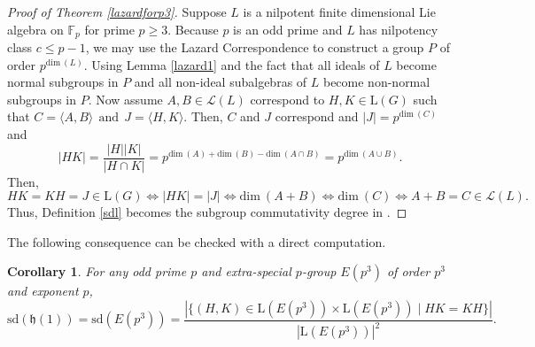 \documentclass{amsart}
\newtheorem{corollary}[theorem]{Corollary}
\theoremstyle{definition}
\numberwithin{equation}{section}
\begin{document}
\begin{proof}[Proof of Theorem \ref{lazardforp3}]
Suppose $L$ is a nilpotent finite dimensional Lie algebra on \(\mathbb{F}_{p}\) for prime $p\ge 3$. 
Because $p$ is an odd prime and $L$ has nilpotency class $c\le p-1$, we may use the Lazard Correspondence to construct a group $P$ of order $p^{\mathrm{dim}\ (L)}$. Using  Lemma \ref{lazard1} and the fact that all ideals of $L$ become normal subgroups in $P$ and all non-ideal subalgebras of $L$ become non-normal subgroups in $P$. Now assume $A,B\in \mathcal{L}(L)$ correspond to $H,K\in \mathrm{L}(G)$ such that 
$C=\langle A, B\rangle  \ \ \mbox{and}\ \  J=\langle H, K\rangle.$
Then, $C$ and $J$ correspond and $|J|=p^{\mathrm{dim}\ (C)}$ and $$|HK|=\frac{|H||K|}{|H\cap K|}=p^{\mathrm{dim}\ (A)+\mathrm{dim}\ (B)-\mathrm{dim}\ (A\cap B)}=p^{\mathrm{dim}\ (A\cup B)}.$$
Then, $$HK=KH=J\in \mathrm{L}(G)\Longleftrightarrow  |HK|=|J| \Longleftrightarrow \mathrm{dim}\ (A+B) 
\Longleftrightarrow \mathrm{dim}\ (C) \Longleftrightarrow A+B=C\in \mathcal{L}(L).$$
Thus, Definition \ref{sdl} becomes the subgroup commutativity degree  in \cite{sr1, sr2, or, mt}.
\end{proof}

The following consequence can be checked with a direct computation.

\begin{corollary} \label{cor3}
For any odd prime $p$ and extra-special $p$-group  $E(p^3)$ of order $p^3$ and exponent $p$,   $$\mathrm{sd}(\mathfrak{h}(1)) =\mathrm{sd}(E(p^3)) = \frac{|\{(H,K)\in \mathrm{L}(E(p^3)) \times \mathrm{L}(E(p^3)) \mid HK=KH\}|}{|\mathrm{L}(E(p^3))|^2}.$$
\end{corollary}
\end{document}
